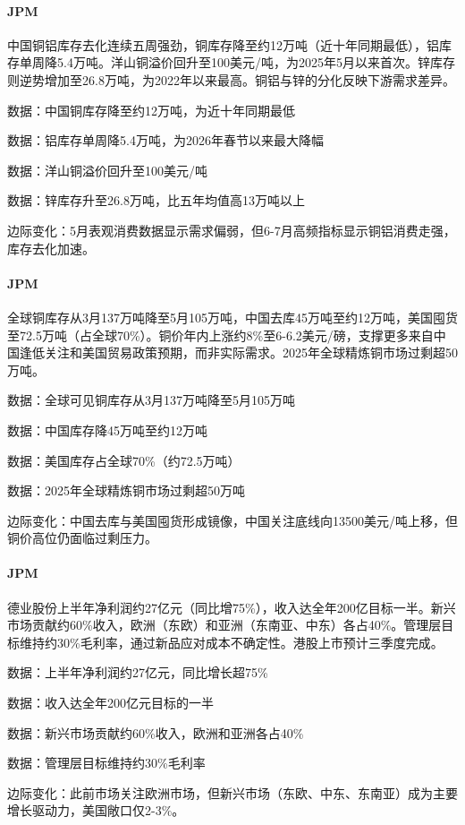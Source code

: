 \documentclass[11pt]{ctexart}
\begin{document}
\paragraph{JPM} 中国铜铝库存去化连续五周强劲，铜库存降至约12万吨（近十年同期最低），铝库存单周降5.4万吨。洋山铜溢价回升至100美元/吨，为2025年5月以来首次。锌库存则逆势增加至26.8万吨，为2022年以来最高。铜铝与锌的分化反映下游需求差异。
{\small\color{refgray}数据：中国铜库存降至约12万吨，为近十年同期最低\par}
{\small\color{refgray}数据：铝库存单周降5.4万吨，为2026年春节以来最大降幅\par}
{\small\color{refgray}数据：洋山铜溢价回升至100美元/吨\par}
{\small\color{refgray}数据：锌库存升至26.8万吨，比五年均值高13万吨以上\par}
{\small\color{refgray}边际变化：5月表观消费数据显示需求偏弱，但6-7月高频指标显示铜铝消费走强，库存去化加速。\par}
\paragraph{JPM} 全球铜库存从3月137万吨降至5月105万吨，中国去库45万吨至约12万吨，美国囤货至72.5万吨（占全球70\%）。铜价年内上涨约8\%至6-6.2美元/磅，支撑更多来自中国逢低关注和美国贸易政策预期，而非实际需求。2025年全球精炼铜市场过剩超50万吨。
{\small\color{refgray}数据：全球可见铜库存从3月137万吨降至5月105万吨\par}
{\small\color{refgray}数据：中国库存降45万吨至约12万吨\par}
{\small\color{refgray}数据：美国库存占全球70\%（约72.5万吨）\par}
{\small\color{refgray}数据：2025年全球精炼铜市场过剩超50万吨\par}
{\small\color{refgray}边际变化：中国去库与美国囤货形成镜像，中国关注底线向13500美元/吨上移，但铜价高位仍面临过剩压力。\par}
\paragraph{JPM} 德业股份上半年净利润约27亿元（同比增75\%），收入达全年200亿目标一半。新兴市场贡献约60\%收入，欧洲（东欧）和亚洲（东南亚、中东）各占40\%。管理层目标维持约30\%毛利率，通过新品应对成本不确定性。港股上市预计三季度完成。
{\small\color{refgray}数据：上半年净利润约27亿元，同比增长超75\%\par}
{\small\color{refgray}数据：收入达全年200亿元目标的一半\par}
{\small\color{refgray}数据：新兴市场贡献约60\%收入，欧洲和亚洲各占40\%\par}
{\small\color{refgray}数据：管理层目标维持约30\%毛利率\par}
{\small\color{refgray}边际变化：此前市场关注欧洲市场，但新兴市场（东欧、中东、东南亚）成为主要增长驱动力，美国敞口仅2-3\%。\par}
\end{document}
